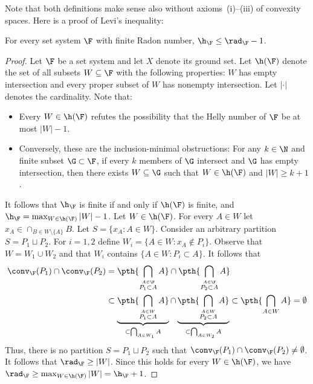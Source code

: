 %
\noindent
Note that both definitions make sense also without axioms~(i)--(iii) of convexity spaces. Here is a proof of Levi's inequality:
%
\begin{lemma}
  For every set system $\F$ with finite Radon number, $\h_\F \le \rad_\F-1$.
\end{lemma}
\begin{proof}
  Let $\F$ be a set system and let $X$ denote its ground set. Let $\h(\F)$ denote the set of all subsets $W \subseteq \F$ with the following properties: $W$ has empty intersection and every proper subset of $W$ has nonempty intersection. Let $|\cdot|$ denotes the cardinality. Note that:
%
  \begin{itemize}
  \item Every $W \in \h(\F)$ refutes the possibility that the Helly number of $\F$ be at most $|W|-1$.\medskip
%
  \item Conversely, these are the inclusion-minimal obstructions: For any $k \in \N$ and finite subset $\G \subset\F$, if every $k$ members of $\G$ intersect and $\G$ has empty intersection, then there exists $W \subseteq \G$ such that $W \in \h(\F)$ and $|W| \ge k+1$.\medskip
  \end{itemize}
%
  \noindent
  It follows that $\h_\F$ is finite if and only if $\h(\F)$ is finite, and $\h_\F = \max_{W \in \h(\F)} |W| - 1$.
%
  \medskip
%
  Let $W \in \h(\F)$. For every $A \in W$ let $x_A \in \cap_{B \in W\setminus\{A\}} B$. Let $S = \{x_A \colon A \in W\}$. Consider an arbitrary partition $S=P_1\sqcup P_2$. 
  For $i=1,2$ define $W_i = \{A \in W \colon x_A \notin P_i\}$. 
%
  Observe that $W = W_1 \cup W_2$ and that $W_i$ contains $\{A \in W \colon P_i \subset A\}$. It follows that
%
  \[\begin{aligned}
  \conv_{\F}(P_1) \cap \conv_{\F}(P_2) & = \pth{\bigcap_{\stackrel{A \in \F}{P_1 \subset A}}A} \cap \pth{\bigcap_{\stackrel{A \in \F}{P_2 \subset A}}A}\\
  & \subset \underbrace{\pth{\bigcap_{\stackrel{A \in W}{P_1 \subset A}}A}}_{\subset\bigcap_{A \in W_1}A} \cap \underbrace{\pth{\bigcap_{\stackrel{A \in W}{P_2 \subset A}}A}}_{\subset\bigcap_{A \in W_2}A} \subset \pth{\bigcap_{A \in W}A} = \emptyset
  \end{aligned}\]
%
  \noindent
  Thus, there is no partition $S=P_1\sqcup P_2$ such that $\conv_{\F}(P_1) \cap \conv_{\F}(P_2) \neq \emptyset$. It follows that $\rad_\F \ge |W|$. Since this holds for every $W \in \h(\F)$, we have $\rad_\F \ge \max_{W \in \h(\F)}|W| = \h_\F+1$.
\end{proof}
